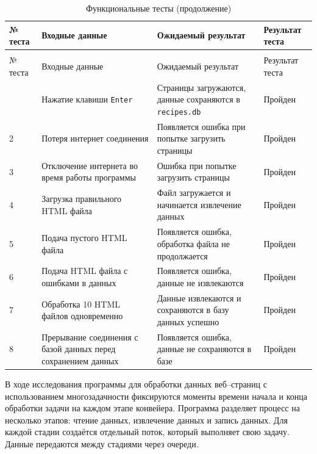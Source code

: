 \begin{longtable}{|p{}|p{}|p{}|p{}|}
    \caption{Функциональные тесты}\label{tbl:tests} \\\hline
    № теста & Входные данные & Ожидаемый результат & Результат теста \\\hline
    \endfirsthead
    \caption{Функциональные тесты (продолжение)} \\\hline
    № теста & Входные данные & Ожидаемый результат & Результат теста \\\hline
    \endhead
    \endfoot
    1 & Нажатие клавиши \texttt{Enter} &
    Страницы загружаются, данные сохраняются в \texttt{recipes.db} &
    Пройден \\\hline
    2 & Потеря интернет соединения &
    Появляется ошибка при попытке загрузить страницы &
    Пройден \\\hline
    3 & Отключение интернета во время работы программы &
    Ошибка при попытке загрузить страницы &
    Пройден \\\hline
    4 & Загрузка правильного HTML файла &
    Файл загружается и начинается извлечение данных &
    Пройден \\\hline
    5 & Подача пустого HTML файла &
    Появляется ошибка, обработка файла не продолжается &
    Пройден \\\hline
    6 & Подача HTML файла с ошибками в данных &
    Появляется ошибка, данные не извлекаются &
    Пройден \\\hline
    7 & Обработка 10 HTML файлов одновременно &
    Данные извлекаются и сохраняются в базу данных успешно &
    Пройден \\\hline
    8 & Прерывание соединения с базой данных перед сохранением данных &
    Появляется ошибка, данные не сохраняются в базе &
    Пройден \\\hline
\end{longtable}


В ходе исследования программы для обработки данных веб--страниц с использованием многозадачности фиксируются моменты времени начала и конца обработки задачи на каждом этапе конвейера. Программа разделяет процесс на несколько этапов: чтение данных, извлечение данных и запись данных. Для каждой стадии создаётся отдельный поток, который выполняет свою задачу. Данные передаются между стадиями через очереди.

